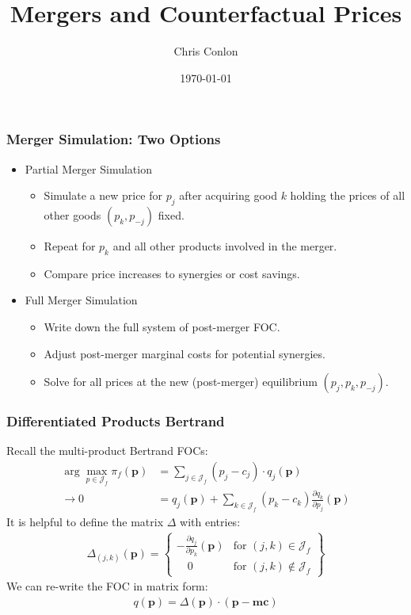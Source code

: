 \documentclass[xcolor=pdftex,dvipsnames,table,mathserif,aspectratio=169]{beamer}
\begin{document}
\title{Mergers and Counterfactual Prices}
\author{Chris Conlon}
\date{\today}

\frame{\titlepage}

\begin{frame}
\frametitle{Merger Simulation: Two Options}
 \begin{itemize}
\item Partial Merger Simulation
 \begin{itemize}
\item Simulate a new price for $p_j$ after acquiring good $k$ holding the prices of all other goods $(p_k,p_{-j})$ fixed.
\item Repeat for $p_k$ and all other products involved in the merger.
\item Compare price increases to \alert{synergies} or cost savings.
 \end{itemize}
 \item Full Merger Simulation
 \begin{itemize}
\item Write down the full system of post-merger FOC.
\item Adjust post-merger marginal costs for potential synergies.
\item Solve for all prices at the new (post-merger) equilibrium $(p_j,p_k,p_{-j})$.
 \end{itemize}
 \end{itemize}
\end{frame}

\begin{frame}
\frametitle{Differentiated Products Bertrand}
\small
Recall the multi-product Bertrand FOCs:
\begin{align*}
\arg \max_{p \in \mathcal{J}_f} \pi_f (\mathbf{p}) &= \sum_{j \in \mathcal{J}_f} (p_j - c_j) \cdot q_j(\mathbf{p}) \\
\rightarrow 0&= q_j(\mathbf{p}) + \sum_{k \in \mathcal{J}_f} (p_k - c_k) \frac{\partial q_{k}}{\partial p_j}(\mathbf{p})
\end{align*}
It is helpful to define the matrix $\Delta$ with entries:
\begin{align*}
\Delta_{(j,k)}(\mathbf{p}) = \left\{\begin{array}{lr}
         - \frac{\partial q_{j}}{\partial p_k}(\mathbf{p}) & \text{for }  (j,k) \in \mathcal{J}_f\\
       	  \quad 0 & \text{for } (j,k) \notin \mathcal{J}_f
        \end{array} \right\}
\end{align*}
We can re-write the FOC in matrix form:
\begin{align*}
q(\mathbf{p}) = \Delta(\mathbf{p})\cdot(\mathbf{p}-\mathbf{mc})
\end{align*}
\end{frame}
\end{document}

